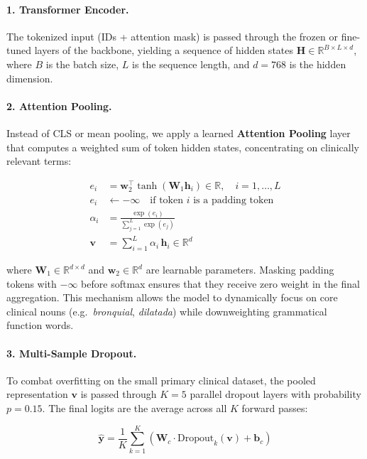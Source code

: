 \documentclass[10pt,a4paper,twocolumn]{article}
\begin{document}
\paragraph{1. Transformer Encoder.}
The tokenized input (IDs + attention mask) is passed through the frozen or
fine-tuned layers of the backbone, yielding a sequence of hidden states
$\mathbf{H} \in \mathbb{R}^{B \times L \times d}$, where $B$ is the batch size,
$L$ is the sequence length, and $d = 768$ is the hidden dimension.

\paragraph{2. Attention Pooling.}
Instead of CLS or mean pooling, we apply a learned \textbf{Attention Pooling}
layer that computes a weighted sum of token hidden states, concentrating on
clinically relevant terms:

\begin{align}
  e_i &= \mathbf{w}_2^\top \tanh(\mathbf{W}_1 \mathbf{h}_i) \in \mathbb{R}, \quad i=1,\ldots,L \\
  e_i &\leftarrow -\infty \quad \text{if token } i \text{ is a padding token} \\
  \alpha_i &= \frac{\exp(e_i)}{\sum_{j=1}^{L} \exp(e_j)} \\
  \mathbf{v} &= \sum_{i=1}^{L} \alpha_i\, \mathbf{h}_i \in \mathbb{R}^d
\end{align}

where $\mathbf{W}_1 \in \mathbb{R}^{d \times d}$ and
$\mathbf{w}_2 \in \mathbb{R}^{d}$ are learnable parameters. Masking padding
tokens with $-\infty$ before softmax ensures that they receive zero weight in
the final aggregation. This mechanism allows the model to dynamically focus
on core clinical nouns (e.g.\ \textit{bronquial}, \textit{dilatada}) while
downweighting grammatical function words.

\paragraph{3. Multi-Sample Dropout.}
To combat overfitting on the small primary clinical dataset, the pooled
representation $\mathbf{v}$ is passed through $K=5$ parallel dropout layers
with probability $p=0.15$. The final logits are the average across all $K$
forward passes:

\begin{equation}
  \hat{\mathbf{y}} = \frac{1}{K} \sum_{k=1}^{K} \left( \mathbf{W}_c \cdot \mathrm{Dropout}_k(\mathbf{v}) + \mathbf{b}_c \right)
\end{equation}
\end{document}
